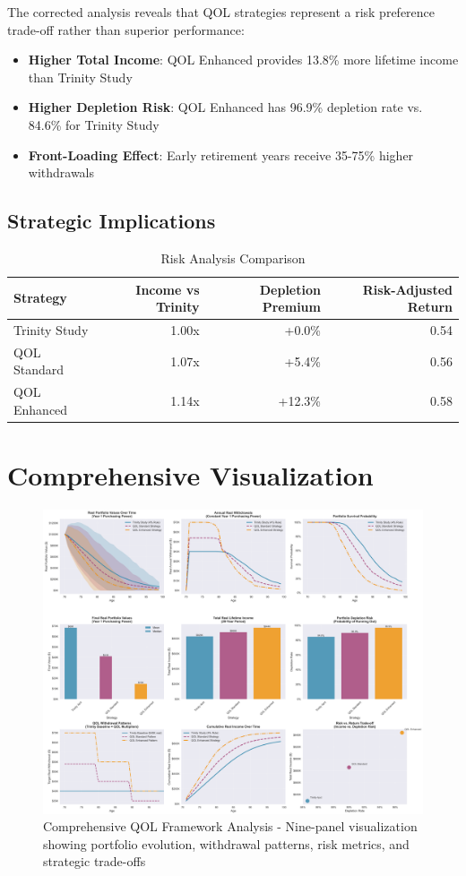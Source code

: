 \documentclass[11pt,letterpaper]{article}
\begin{document}
The corrected analysis reveals that QOL strategies represent a \textcolor{warningorange}{risk preference trade-off} rather than superior performance:

\begin{itemize}
    \item \textbf{Higher Total Income}: QOL Enhanced provides 13.8\% more lifetime income than Trinity Study
    \item \textbf{Higher Depletion Risk}: QOL Enhanced has 96.9\% depletion rate vs. 84.6\% for Trinity Study
    \item \textbf{Front-Loading Effect}: Early retirement years receive 35-75\% higher withdrawals
\end{itemize}

\subsection{Strategic Implications}

\begin{table}[H]
\centering
\caption{Risk Analysis Comparison}
\begin{tabular}{lrrr}
\toprule
\textbf{Strategy} & \textbf{Income vs Trinity} & \textbf{Depletion Premium} & \textbf{Risk-Adjusted Return} \\
\midrule
Trinity Study & 1.00x & +0.0\% & 0.54 \\
QOL Standard & 1.07x & +5.4\% & 0.56 \\
QOL Enhanced & 1.14x & +12.3\% & 0.58 \\
\bottomrule
\end{tabular}
\end{table}

\section{Comprehensive Visualization}

\begin{figure}[H]
\centering
\includegraphics[width=\textwidth]{../charts/comprehensive_qol_analysis.png}
\caption{Comprehensive QOL Framework Analysis - Nine-panel visualization showing portfolio evolution, withdrawal patterns, risk metrics, and strategic trade-offs}
\end{figure}
\end{document}
